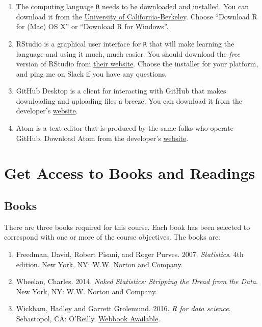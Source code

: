 \documentclass[]{book}
\theoremstyle{definition}
\theoremstyle{definition}
\theoremstyle{definition}
\theoremstyle{remark}
\begin{document}
\begin{enumerate}
\def\labelenumi{\arabic{enumi}.}
\item
  The computing language \texttt{R} needs to be downloaded and
  installed. You can download it from the
  \href{https://cran.cnr.berkeley.edu}{University of
  California-Berkeley}. Choose ``Download R for (Mac) OS X'' or
  ``Download R for Windows''.
\item
  RStudio is a graphical user interface for \texttt{R} that will make
  learning the language and using it much, much easier. You should
  download the \emph{free} version of RStudio from
  \href{https://www.rstudio.com/products/rstudio/download/\#download}{their
  website}. Choose the installer for your platform, and ping me on Slack
  if you have any questions.
\item
  GitHub Desktop is a client for interacting with GitHub that makes
  downloading and uploading files a breeze. You can download it from the
  developer's \href{http://desktop.github.com}{website}.
\item
  Atom is a text editor that is produced by the same folks who operate
  GitHub. Download Atom from the developer's
  \href{http://atom.io}{website}.
\end{enumerate}

\section{Get Access to Books and
Readings}\label{get-access-to-books-and-readings}

\subsection{Books}\label{books}

There are three books required for this course. Each book has been
selected to correspond with one or more of the course objectives. The
books are:

\begin{enumerate}
\def\labelenumi{\arabic{enumi}.}
\item
  Freedman, David, Robert Pisani, and Roger Purves. 2007.
  \emph{Statistics}. 4th edition. New York, NY: W.W. Norton and Company.
\item
  Wheelan, Charles. 2014. \emph{Naked Statistics: Stripping the Dread
  from the Data}. New York, NY: W.W. Norton and Company.
\item
  Wickham, Hadley and Garrett Grolemund. 2016. \emph{R for data
  science}. Sebastopol, CA: O'Reilly.
  \href{http://r4ds.had.co.nz}{Webbook Available}.
\end{enumerate}
\end{document}
